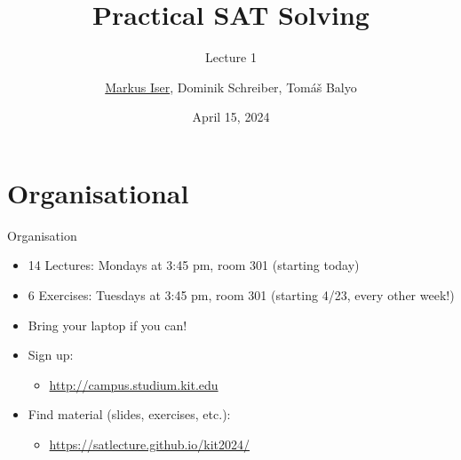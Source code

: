 \documentclass[t]{sdqbeamer}
\title[SAT Solving]{Practical SAT Solving}
\subtitle{Lecture 1}
\author{\underline{Markus Iser}, Dominik Schreiber, Tom\'a\v{s} Balyo}
\date{April 15, 2024}
\begin{document}
\begin{frame}
	\thispagestyle{empty}
	\titlepage
\end{frame}

\section{Organisational}
\begin{frame}{Organisation}
	\begin{itemize}\setlength{\itemsep}{1em}
		\item 14 Lectures: Mondays at 3:45 pm, room 301 (starting today)
		\item 6 Exercises: Tuesdays at 3:45 pm, room 301 (starting 4/23, every other week!)
		\item Bring your laptop if you can!
		\item Sign up:
		\begin{itemize}
			\item \url{http://campus.studium.kit.edu}
		\end{itemize}
		\item Find material (slides, exercises, etc.):
		\begin{itemize}
			\item \url{https://satlecture.github.io/kit2024/}
		\end{itemize}
	\end{itemize}
\end{frame}
\end{document}
